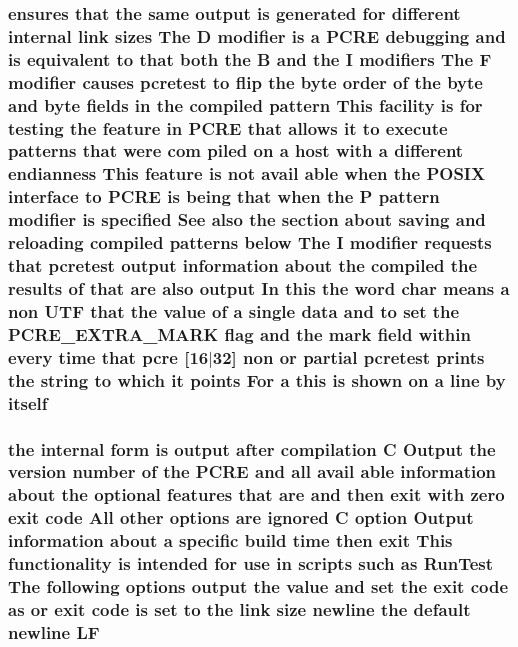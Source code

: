 \subsubsection[{\texorpdfstring{itself}{itself}}]{ ensures that the same {\bf output} {\bf is} {\bf generated} for different internal link sizes The {\bf D} {\bf modifier} {\bf is} {\bf a} {\bf P\+C\+RE} debugging and {\bf is} equivalent {\bf to} that both the {\bf B} and the {\bf I} {\bf modifiers} The {\bf F} {\bf modifier} causes {\bf pcretest} {\bf to} flip the byte {\bf order} {\bf of} the byte and byte {\bf fields} {\bf in} the {\bf compiled} {\bf pattern} This {\bf facility} {\bf is} for testing the {\bf feature} {\bf in} {\bf P\+C\+RE} that allows {\bf it} {\bf to} execute {\bf patterns} that were com piled {\bf on} {\bf a} {\bf host} {\bf with} {\bf a} different endianness This {\bf feature} {\bf is} {\bf not} avail {\bf able} when the P\+O\+S\+IX interface {\bf to} {\bf P\+C\+RE} {\bf is} being that when the P {\bf pattern} {\bf modifier} {\bf is} {\bf specified} See also the {\bf section} about saving and reloading {\bf compiled} {\bf patterns} {\bf below} The {\bf I} {\bf modifier} {\bf requests} that {\bf pcretest} {\bf output} information about the {\bf compiled} the {\bf results} {\bf of} that {\bf are} also {\bf output} In {\bf this} the {\bf word} char means {\bf a} non U\+TF that the {\bf value} {\bf of} {\bf a} single {\bf data} and {\bf to} {\bf set} the {\bf P\+C\+R\+E\+\_\+\+E\+X\+T\+R\+A\+\_\+\+M\+A\+RK} {\bf flag} and the {\bf mark} {\bf field} within every {\bf time} that {\bf pcre} \mbox{[}16$\vert$32\mbox{]} non {\bf or} {\bf partial} {\bf pcretest} prints the {\bf string} {\bf to} {\bf which} {\bf it} points For {\bf a} {\bf this} {\bf is} shown {\bf on} {\bf a} {\bf line} by itself}\hypertarget{pcretest_8txt_ab60095063ff50c16f555d29d809e03b5}{}\label{pcretest_8txt_ab60095063ff50c16f555d29d809e03b5}
\subsubsection[{\texorpdfstring{LF}{LF}}]{\setlength{\rightskip}{0pt plus 5cm}the internal form {\bf is} {\bf output} {\bf after} {\bf compilation} {\bf C} Output the version {\bf number} {\bf of} the {\bf P\+C\+RE} and {\bf all} avail {\bf able} information about the {\bf optional} {\bf features} that {\bf are} and then {\bf exit} {\bf with} {\bf zero} {\bf exit} {\bf code} All other {\bf options} {\bf are} {\bf ignored} {\bf C} {\bf option} Output information about {\bf a} specific build {\bf time} then {\bf exit} This functionality {\bf is} intended for use {\bf in} {\bf scripts} such {\bf as} Run\+Test The following {\bf options} {\bf output} the {\bf value} and {\bf set} the {\bf exit} {\bf code} {\bf as} {\bf or} {\bf exit} {\bf code} {\bf is} {\bf set} {\bf to} the link {\bf size} {\bf newline} the {\bf default} {\bf newline} LF}\hypertarget{pcretest_8txt_ad35f128d4e5819c911ef56fc08161a63}{}\label{pcretest_8txt_ad35f128d4e5819c911ef56fc08161a63}
